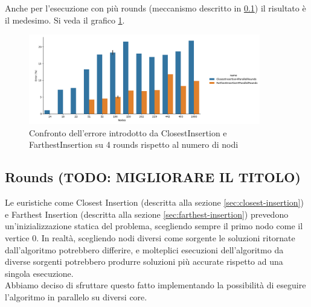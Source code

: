 \noindent Anche per l'esecuzione con più rounds (meccanismo descritto
in \ref{sec:rounds}) il risultato è il medesimo. Si veda il grafico
\ref{fig:closest-farthest-insertion-4-rounds-accuracy-error}.\\

\begin{figure}[H]
    \centering

    \includegraphics[width=0.9\textwidth]{./images/ClosestInsertion4ParallelRounds_vs_FarthestInsertion4ParallelRounds__approximation_error_.png}

    \caption{Confronto dell'errore introdotto da ClosestInsertion e FarthestInsertion su 4 rounds rispetto al numero di nodi}
    \label{fig:closest-farthest-insertion-4-rounds-accuracy-error}
\end{figure}

\subsection{Rounds (TODO: MIGLIORARE IL TITOLO)}
\label{sec:rounds}

\noindent Le euristiche come Closest Insertion (descritta alla sezione
\ref{sec:closest-insertion}) e Farthest Insertion (descritta alla
sezione \ref{sec:farthest-insertion}) prevedono un'inizializzazione
statica del problema, scegliendo sempre il primo nodo come il vertice
0. In realtà, scegliendo nodi diversi come sorgente le soluzioni
ritornate dall'algoritmo potrebbero differire, e molteplici esecuzioni
dell'algoritmo da diverse sorgenti potrebbero produrre soluzioni più
accurate rispetto ad una singola esecuzione.\\

\noindent Abbiamo deciso di sfruttare questo fatto implementando la
possibilità di eseguire l'algoritmo in parallelo su diversi core.\\

